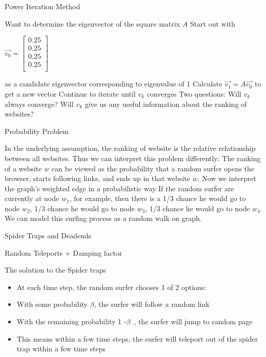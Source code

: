 \documentclass{beamer}
\begin{document}
\begin{frame}[t]{Power Iteration Method}
\begin{outline}
    \1 Want to determine the eigenvector of the square matrix $A$
    \1 Start out with 
    \begin{center}
        $\vec{v_0} = \begin{bmatrix}
            0.25 \\ 0.25 \\ 0.25 \\ 0.25 \\
        \end{bmatrix}$
    \end{center}
    as a candidate eigenvector corresponding to eigenvalue of 1
    \1 Calculate $\vec{v_1} = A\vec{v_0}$ to get a new vector
    \1 Continue to iterate until $v_k$ converges 
    \1 Two questions:
        \2 Will $v_k$ always converge?
        \2 Will $v_k$ give us any useful information about the ranking of websites?
\end{outline}
\end{frame}

\begin{frame}[t]{Probability Problem}
\begin{outline}
    \1 In the underlying assumption, the ranking of website is the relative relationship between all websites. 
    \1 Thus we can interpret this problem differently: 
    \1 The ranking of a website $w$ can be viewed as the probability that a random surfer opens the browser, starts following links, and ends up in that website $w$.
    \1 Now we interpret the graph's weighted edge in a probabilistic way
    \1 If the random surfer are currently at node $w_1$, for example, then there is a 1/3 chance he would go to node $w_2$, 1/3 chance he would go to node $w_3$, 1/3 chance he would go to node $w_4$. 
    \1 We can model this surfing process as a random walk on graph. 
\end{outline}
\end{frame}

\begin{frame}[t]{Spider Traps and Deadends}

\end{frame}

\begin{frame}[t]{Random Teleports + Damping factor}
    
\end{frame}

\begin{frame}[t]{The solution to the Spider traps}
    \begin{itemize}
        \item At each time step, the random surfer chooses 1 of 2 options:
        \item With some probability $\beta$, the surfer will follow a random link
        \item With the remaining probability 1 -$\beta$ , the surfer will jump to random page
        \item This means within a few time steps, the surfer will teleport out of the spider trap within a few time steps
    \end{itemize}
\end{frame}
    
\end{document}
